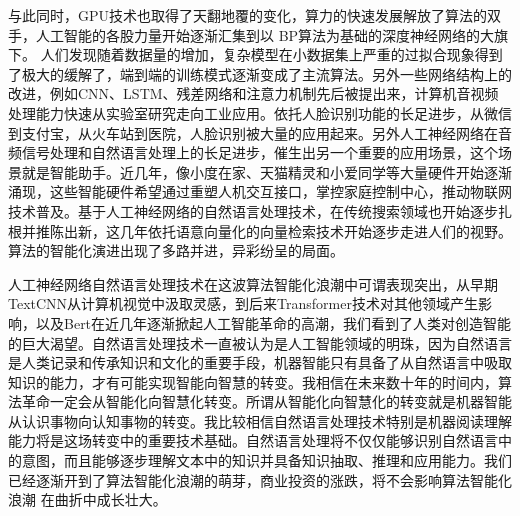 \documentclass[twoside,a4paper,12pt]{book}%
\begin{document}
与此同时，GPU技术也取得了天翻地覆的变化，算力的快速发展解放了算法的双手，人工智能的各股力量开始逐渐汇集到以
BP算法为基础的深度神经网络的大旗下。
人们发现随着数据量的增加，复杂模型在小数据集上严重的过拟合现象得到了极大的缓解了，端到端的训练模式逐渐变成了主流算法。另外一些网络结构上的改进，例如\gls{CNN}、\gls{LSTM}、残差网络和注意力机制先后被提出来，计算机音视频处理能力快速从实验室研究走向工业应用。依托人脸识别功能的长足进步，从微信到支付宝，从火车站到医院，人脸识别被大量的应用起来。另外人工神经网络在音频信号处理和自然语言处理上的长足进步，催生出另一个重要的应用场景，这个场景就是智能助手。近几年，像小度在家、天猫精灵和小爱同学等大量硬件开始逐渐涌现，这些智能硬件希望通过重塑人机交互接口，掌控家庭控制中心，推动物联网技术普及。基于人工神经网络的自然语言处理技术，在传统搜索领域也开始逐步扎根并推陈出新，这几年依托语意向量化的向量检索技术开始逐步走进人们的视野。算法的智能化演进出现了多路并进，异彩纷呈的局面。

人工神经网络自然语言处理技术在这波算法智能化浪潮中可谓表现突出，从早期TextCNN从计算机视觉中汲取灵感，到后来Transformer技术对其他领域产生影响，以及Bert在近几年逐渐掀起人工智能革命的高潮，我们看到了人类对创造智能的巨大渴望。自然语言处理技术一直被认为是人工智能领域的明珠，因为自然语言是人类记录和传承知识和文化的重要手段，机器智能只有具备了从自然语言中吸取知识的能力，才有可能实现智能向智慧的转变。我相信在未来数十年的时间内，算法革命一定会从智能化向智慧化转变。所谓从智能化向智慧化的转变就是机器智能从认识事物向认知事物的转变。我比较相信自然语言处理技术特别是机器阅读理解能力将是这场转变中的重要技术基础。自然语言处理将不仅仅能够识别自然语言中的意图，而且能够逐步理解文本中的知识并具备知识抽取、推理和应用能力。我们已经逐渐开到了算法智能化浪潮的萌芽，商业投资的涨跌，将不会影响算法智能化浪潮
在曲折中成长壮大。
\end{document}
